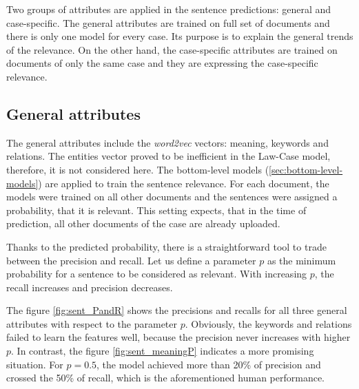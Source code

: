 \documentclass[
  digital, %
  notable,   %
  nolof,     %
  nolot,     %
  draft
]{fithesis3}
\begin{document}
Two groups of attributes are applied in the sentence predictions: general and case-specific. 
The general attributes are trained on full set of documents and there is only one model for every case.
Its purpose is to explain the general trends of the relevance.
On the other hand, the case-specific attributes are trained on documents of only the same case and they are expressing the case-specific relevance.

\subsection{General attributes}
The general attributes include the \textit{word2vec} vectors: meaning, keywords and relations.
The entities vector proved to be inefficient in the Law-Case model, therefore, it is not considered here.
The bottom-level models (\ref{sec:bottom-level-models}) are applied to train the sentence relevance.
For each document, the models were trained on all other documents and the sentences were assigned a probability, that it is relevant.
This setting expects, that in the time of prediction, all other documents of the case are already uploaded.

Thanks to the predicted probability, there is a straightforward tool to trade between the precision and recall.
Let us define a parameter $p$ as the minimum probability for a sentence to be considered as relevant.
With increasing $p$, the recall increases and precision decreases.

The figure \ref{fig:sent_PandR} shows the precisions and recalls for all three general attributes with respect to the parameter $p$.
Obviously, the keywords and relations failed to learn the features well, because the precision never increases with higher $p$.
In contrast, the figure \ref{fig:sent_meaningP} indicates a more promising situation.
For $p=0.5$, the model achieved more than 20\% of precision and crossed the 50\% of recall, which is the aforementioned human performance.
\end{document}
